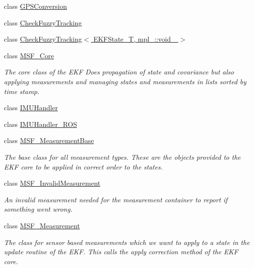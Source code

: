 \begin{DoxyCompactItemize}
\item 
class \hyperlink{classmsf__core_1_1GPSConversion}{G\-P\-S\-Conversion}
\item 
class \hyperlink{classmsf__core_1_1CheckFuzzyTracking}{Check\-Fuzzy\-Tracking}
\item 
class \hyperlink{classmsf__core_1_1CheckFuzzyTracking_3_01EKFState__T_00_01mpl___1_1void___01_4}{Check\-Fuzzy\-Tracking$<$ E\-K\-F\-State\-\_\-\-T, mpl\-\_\-\-::void\-\_\- $>$}
\item 
class \hyperlink{classmsf__core_1_1MSF__Core}{M\-S\-F\-\_\-\-Core}
\begin{DoxyCompactList}\small\item\em The core class of the E\-K\-F Does propagation of state and covariance but also applying measurements and managing states and measurements in lists sorted by time stamp. \end{DoxyCompactList}\item 
class \hyperlink{classmsf__core_1_1IMUHandler}{I\-M\-U\-Handler}
\item 
class \hyperlink{classmsf__core_1_1IMUHandler__ROS}{I\-M\-U\-Handler\-\_\-\-R\-O\-S}
\item 
class \hyperlink{classmsf__core_1_1MSF__MeasurementBase}{M\-S\-F\-\_\-\-Measurement\-Base}
\begin{DoxyCompactList}\small\item\em The base class for all measurement types. These are the objects provided to the E\-K\-F core to be applied in correct order to the states. \end{DoxyCompactList}\item 
class \hyperlink{classmsf__core_1_1MSF__InvalidMeasurement}{M\-S\-F\-\_\-\-Invalid\-Measurement}
\begin{DoxyCompactList}\small\item\em An invalid measurement needed for the measurement container to report if something went wrong. \end{DoxyCompactList}\item 
class \hyperlink{classmsf__core_1_1MSF__Measurement}{M\-S\-F\-\_\-\-Measurement}
\begin{DoxyCompactList}\small\item\em The class for sensor based measurements which we want to apply to a state in the update routine of the E\-K\-F. This calls the apply correction method of the E\-K\-F core. \end{DoxyCompactList}\item 

\end{DoxyCompactItemize}
